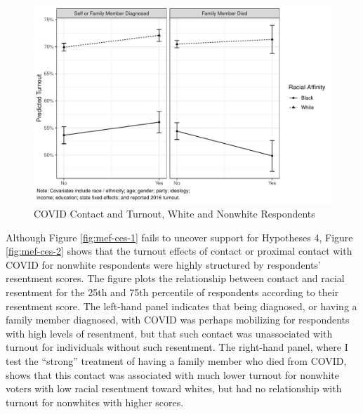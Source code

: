 \documentclass[
  12pt,
]{article}
\begin{document}
\begin{figure}[H]

{\centering \includegraphics{wa_covid_files/figure-latex/mef1-1} 

}

\caption{\label{fig:mef-ces-1}COVID Contact and Turnout, White and Nonwhite Respondents}\label{fig:mef1}
\end{figure}

Although Figure \ref{fig:mef-ces-1} fails to uncover support for Hypotheses 4, Figure \ref{fig:mef-ces-2} shows that the turnout effects of contact or proximal contact with COVID for nonwhite respondents were highly structured by respondents' resentment scores. The figure plots the relationship between contact and racial resentment for the 25th and 75th percentile of respondents according to their resentment score. The left-hand panel indicates that being diagnosed, or having a family member diagnosed, with COVID was perhaps mobilizing for respondents with high levels of resentment, but that such contact was unassociated with turnout for individuals without such resentment. The right-hand panel, where I test the ``strong'' treatment of having a family member who died from COVID, shows that this contact was associated with much lower turnout for nonwhite voters with low racial resentment toward whites, but had no relationship with turnout for nonwhites with higher scores.
\end{document}
